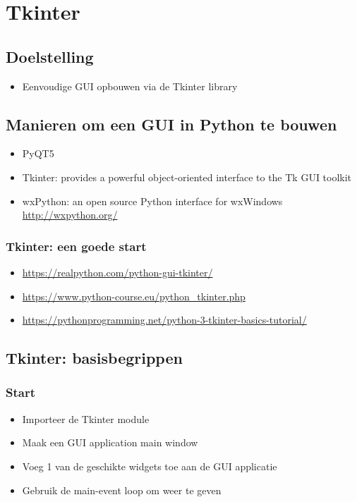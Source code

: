 \documentclass{article}
\begin{document}
\section{Tkinter}

\subsection{Doelstelling}

\begin{itemize}
    \item Eenvoudige GUI opbouwen via de Tkinter library
\end{itemize}

\subsection{Manieren om een GUI in Python te bouwen}

\begin{itemize}
    \item PyQT5
    \item Tkinter: provides a powerful object-oriented interface to the Tk GUI toolkit
    \item wxPython: an open source Python interface for wxWindows \url{http://wxpython.org/}
\end{itemize}

\subsubsection{Tkinter: een goede start}

\begin{itemize}
    \item \url{https://realpython.com/python-gui-tkinter/}
    \item \url{https://www.python-course.eu/python_tkinter.php}
    \item \url{https://pythonprogramming.net/python-3-tkinter-basics-tutorial/}
\end{itemize}

\subsection{Tkinter: basisbegrippen}

\subsubsection{Start}

\begin{itemize}
    \item Importeer de Tkinter module
    \item Maak een GUI application main window
    \item Voeg 1 van de geschikte widgets toe aan de GUI applicatie
    \item Gebruik de main-event loop om weer te geven
\end{itemize}
\end{document}
